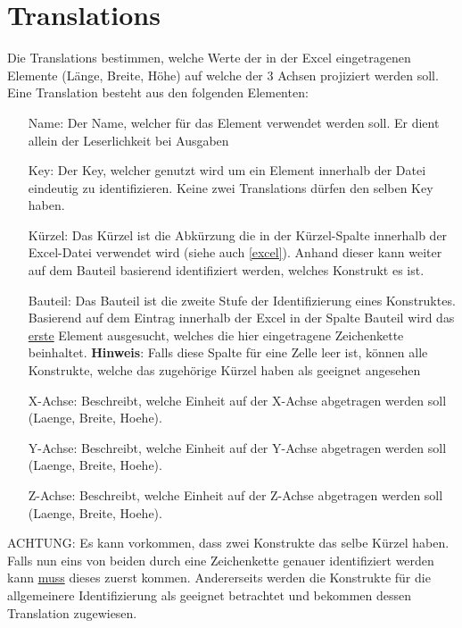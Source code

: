 \documentclass{book}
\newcommand{\hinweis}[1]{\newline \textbf{Hinweis}: #1 \newline}
\newcommand{\red}[1]{\color{red}#1\color{black}\xspace}
\begin{document}
		\section{Translations} \label{Translation}
			Die Translations bestimmen, welche Werte der in der Excel eingetragenen Elemente (Länge, Breite, Höhe) auf welche der 3 Achsen projiziert werden soll. Eine Translation besteht aus den folgenden Elementen:
			\begin{itemize}
				\setlength{\itemindent}{1cm}
				\item[Name:] Der Name, welcher für das Element verwendet werden soll. Er dient allein der Leserlichkeit bei Ausgaben
				\item[Key:] Der Key, welcher genutzt wird um ein Element innerhalb der Datei eindeutig zu identifizieren. Keine zwei Translations dürfen den selben Key haben.
				\item[Kürzel:] Das Kürzel ist die Abkürzung die in der \glqq Kürzel\grqq -Spalte innerhalb der Excel-Datei verwendet wird (siehe auch \hyperref[excel]{\ref{excel}}). Anhand dieser kann weiter auf dem Bauteil basierend identifiziert werden, welches Konstrukt es ist.
				\item[Bauteil:] Das Bauteil ist die zweite Stufe der Identifizierung eines Konstruktes. Basierend auf dem Eintrag innerhalb der Excel in der Spalte \glqq Bauteil \grqq wird das \underline{erste} Element ausgesucht, welches die hier eingetragene Zeichenkette beinhaltet.
				\hinweis{Falls diese Spalte für eine Zelle leer ist, können alle Konstrukte, welche das zugehörige Kürzel haben als geeignet angesehen}
				\item[X-Achse:] Beschreibt, welche Einheit auf der X-Achse abgetragen werden soll (Laenge, Breite, Hoehe).
				\item[Y-Achse:] Beschreibt, welche Einheit auf der Y-Achse abgetragen werden soll (Laenge, Breite, Hoehe).
				\item[Z-Achse:] Beschreibt, welche Einheit auf der Z-Achse abgetragen werden soll (Laenge, Breite, Hoehe).
			\end{itemize}
		
			\red{ACHTUNG}: Es kann vorkommen, dass zwei Konstrukte das selbe Kürzel haben. Falls nun eins von beiden durch eine Zeichenkette genauer identifiziert werden kann \underline{muss} dieses zuerst kommen. Andererseits werden die Konstrukte für die allgemeinere Identifizierung als geeignet betrachtet und bekommen dessen Translation zugewiesen.\\
			
\end{document}
